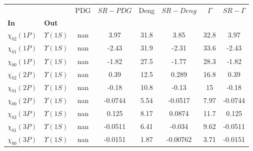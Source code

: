 \begin{tabular}{l|l|c|c|c|c|c|c}
\toprule
                &                &  PDG & $SR-PDG$ &  Deng & $SR-Deng$ &  $\Gamma$ & $SR-\Gamma$ \\
\textbf{In} & \textbf{Out} &      &          &       &           &           &             \\
\midrule
\textbf{$\chi_{b2}(1P)$} & \textbf{$\Upsilon(1S)$} &  nan &     3.97 &  31.8 &      3.85 &      32.8 &        3.97 \\
\textbf{$\chi_{b1}(1P)$} & \textbf{$\Upsilon(1S)$} &  nan &    -2.43 &  31.9 &     -2.31 &      33.6 &       -2.43 \\
\textbf{$\chi_{b0}(1P)$} & \textbf{$\Upsilon(1S)$} &  nan &    -1.82 &  27.5 &     -1.77 &      28.3 &       -1.82 \\
\textbf{$\chi_{b2}(2P)$} & \textbf{$\Upsilon(1S)$} &  nan &     0.39 &  12.5 &     0.289 &      16.8 &        0.39 \\
\textbf{$\chi_{b1}(2P)$} & \textbf{$\Upsilon(1S)$} &  nan &    -0.18 &  10.8 &     -0.13 &        15 &       -0.18 \\
\textbf{$\chi_{b0}(2P)$} & \textbf{$\Upsilon(1S)$} &  nan &  -0.0744 &  5.54 &   -0.0517 &      7.97 &     -0.0744 \\
\textbf{$\chi_{b2}(3P)$} & \textbf{$\Upsilon(1S)$} &  nan &    0.125 &  8.17 &    0.0874 &      11.7 &       0.125 \\
\textbf{$\chi_{b1}(3P)$} & \textbf{$\Upsilon(1S)$} &  nan &  -0.0511 &  6.41 &    -0.034 &      9.62 &     -0.0511 \\
\textbf{$\chi_{b0}(3P)$} & \textbf{$\Upsilon(1S)$} &  nan &  -0.0151 &  1.87 &  -0.00762 &      3.71 &     -0.0151 \\
\bottomrule
\end{tabular}
